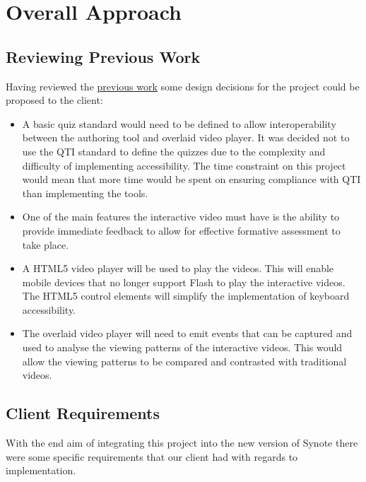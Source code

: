 \chapter{Overall Approach} 
\label{Chapter:Overall Approach}


\section{Reviewing Previous Work}
Having reviewed the \href{Chapter:Previous Work}{previous work} some design decisions for the project could be proposed to the client:
\begin{itemize}
\item A basic quiz standard would need to be defined to allow interoperability between the authoring tool and overlaid video player. It was decided not to use the \gls{QTI} standard to define the quizzes due to the complexity and difficulty of implementing accessibility. The time constraint on this project would mean that more time would be spent on ensuring compliance with \gls{QTI} than implementing the tools.
\item One of the main features the interactive video must have is the ability to provide immediate feedback to allow for effective formative assessment to take place.
\item A HTML5 video player will be used to play the videos. This will enable mobile devices that no longer support Flash to play the interactive videos. The HTML5 control elements will simplify the implementation of keyboard accessibility.
\item The overlaid video player will need to emit events that can be captured and used to analyse the viewing patterns of the interactive videos. This would allow the viewing patterns to be compared and contrasted with traditional videos.
\end{itemize}
\section{Client Requirements}
With the end aim of integrating this project into the new version of Synote there were some specific requirements that our client had with regards to implementation.

